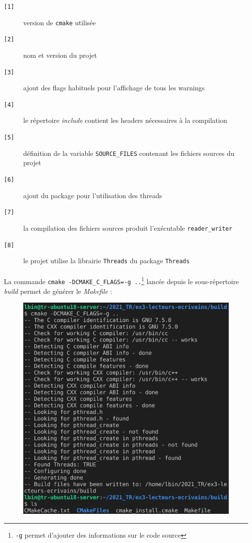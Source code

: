 \documentclass{article}
\begin{document}
    \begin{description}
        \item[\texttt{[1]}] version de \texttt{cmake} utilisée
        \item[\texttt{[2]}] nom et version du projet
        \item[\texttt{[3]}] ajout des flags habituels pour l'affichage de tous les warnings
        \item[\texttt{[4]}] le répertoire \emph{include} contient les headers nécessaires à la compilation
        \item[\texttt{[5]}] définition de la variable \texttt{SOURCE\_FILES} contenant les fichiers sources du projet
        \item[\texttt{[6]}] ajout du package pour l'utilisation des threads
        \item[\texttt{[7]}] la compilation des fichiers sources produit l'exécutable \texttt{reader\_writer} 
        \item[\texttt{[8]}] le projet utilise la librairie \texttt{Threads} du package \texttt{Threads}
    \end{description}

    \newpage
    \paragraph{}
    La commande \texttt{cmake -DCMAKE\_C\_FLAGS=-g ..}\footnote{\texttt{-g} permet d'ajouter des informations sur le code source} lancée depuis le sous-répertoire \emph{build} permet de générer le \emph{Makefile} :
    \begin{figure}[H]
        \centering
        \includegraphics[width=.65\textwidth]{./screenshots/cmake.png}
    \end{figure}
\end{document}
